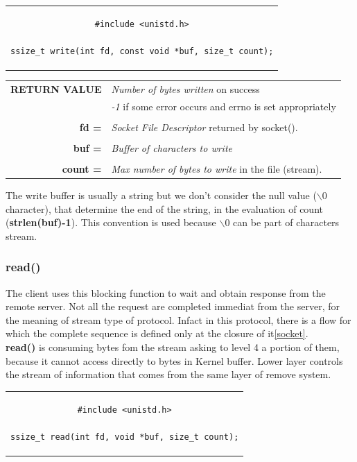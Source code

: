 \begin{center}
\begin{tabular}{c}
\begin{lstlisting}[linewidth=280pt, basicstyle=\footnotesize\sffamily,]
#include <unistd.h>

ssize_t write(int fd, const void *buf, size_t count);
\end{lstlisting}
\end{tabular}
\end{center}

\begin{table}[h]
\centering
\begin{tabular}{rcl}
\textbf{RETURN VALUE} & \multicolumn{2}{l}{\textit{Number of bytes written} on success}\\
{} & \multicolumn{2}{l}{\textit{-1} if some error occurs and errno is set appropriately}\\
& & \\
\textbf{fd =} & \multicolumn{2}{l}{\textit{Socket File Descriptor} returned by socket().}\\
& &\\
\textbf{buf =} & \multicolumn{2}{l}{\textit{Buffer of characters to write}}\\
& & \\
\textbf{count =} & \multicolumn{2}{l}{\textit{Max number of bytes to write} in the file (stream).}\\
\end{tabular}
\end{table}
The write buffer is usually a string but we don't consider the null value (\textbf{$\backslash 0$} character), that determine the end of the string, in the evaluation of count (\textbf{strlen(buf)-1}). This convention is used because \textbf{$\backslash 0$} can be part of characters stream.\\

\subsubsection{read()}
The client uses this blocking function to wait and obtain response from the remote server. Not all the request are completed immediat from the server, for the meaning of stream type of protocol. Infact in this protocol, there is a flow for which the complete sequence is defined only at the closure of it\ref{socket}.\\
\textbf{read()} is consuming bytes fom the stream asking to level 4 a portion of them, because it cannot access directly to bytes in Kernel buffer. Lower layer controls the stream of information that comes from the same layer of remove system.
\begin{center}
\begin{tabular}{c}
\begin{lstlisting}[linewidth=280pt, basicstyle=\footnotesize\sffamily,]
#include <unistd.h>

ssize_t read(int fd, void *buf, size_t count);
\end{lstlisting}
\end{tabular}
\end{center}

